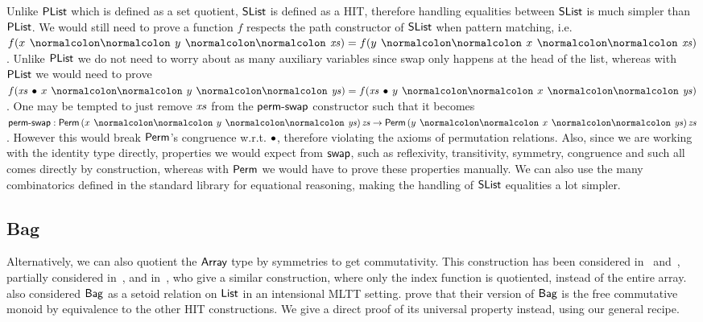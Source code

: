 \begin{toappendix}
    Unlike $\operatorname{\mathsf{PList}}$ which is defined as a set quotient, $\operatorname{\mathsf{SList}}$ is defined as a HIT, therefore handling equalities
    between $\operatorname{\mathsf{SList}}$ is much simpler than $\operatorname{\mathsf{PList}}$. We would still need to prove a function $f$ respects
    the path constructor of $\operatorname{\mathsf{SList}}$ when pattern matching, i.e. $f(x \cons y \cons \xs) = f(y \cons x \cons \xs)$.
    Unlike $\operatorname{\mathsf{PList}}$ we do not need to worry about as many auxiliary variables since swap
    only happens at the head of the list, whereas with $\operatorname{\mathsf{PList}}$ we would need to prove
    $f(\xs\,\mult\,x \cons y \cons \ys) = f(\xs\,\mult\,y \cons x \cons \ys)$. One may be tempted to just remove $\mathit{xs}$
    from the $\operatorname{\mathsf{perm-swap}}$ constructor such that it becomes
    $\term{perm-swap} : \Perm\,(x \cons y \cons \ys)\,\zs \to \Perm\,(y \cons x \cons \ys)\,\zs$.
    However this would break $\operatorname{\mathsf{Perm}}$'s congruence w.r.t. $\mathbin{\bullet}$, therefore violating the axioms of
    permutation relations. Also, since we are working with the identity type directly, properties we would
    expect from $\operatorname{\mathsf{swap}}$, such as reflexivity, transitivity, symmetry, congruence and such all comes directly by
    construction, whereas with $\operatorname{\mathsf{Perm}}$ we would have to prove these properties manually.
    We can also use the many combinatorics defined in the standard library for equational reasoning,
    making the handling of $\operatorname{\mathsf{SList}}$ equalities a lot simpler.
\end{toappendix}

\subsection{Bag}
\label{sec:cmon:bag}

Alternatively, we can also quotient the $\operatorname{\mathsf{Array}}$ type by symmetries to get commutativity.
%
This construction has been considered in~\cite{altenkirchDefinableQuotientsType2011}
and~\cite{liQuotientTypesType2015},
partially considered in~\cite{choudhuryFreeCommutativeMonoids2023},
and in~\cite{joramConstructiveFinalSemantics2023},
who give a similar construction, where only the index function is quotiented, instead of
the entire array.
%
\cite{danielssonBagEquivalenceProofRelevant2012} also considered $\operatorname{\mathsf{Bag}}$ as a setoid relation
on $\operatorname{\mathsf{List}}$ in an intensional MLTT setting.
%
\cite{joramConstructiveFinalSemantics2023} prove that their version of $\operatorname{\mathsf{Bag}}$
is the free commutative monoid by equivalence to the other HIT constructions.
%
We give a direct proof of its universal property instead, using our general recipe.

